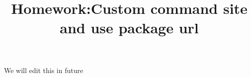 \documentclass{article}
\title{Homework:Custom command site and use package url}
\begin{document}
	We will edit this in future
\end{document}
